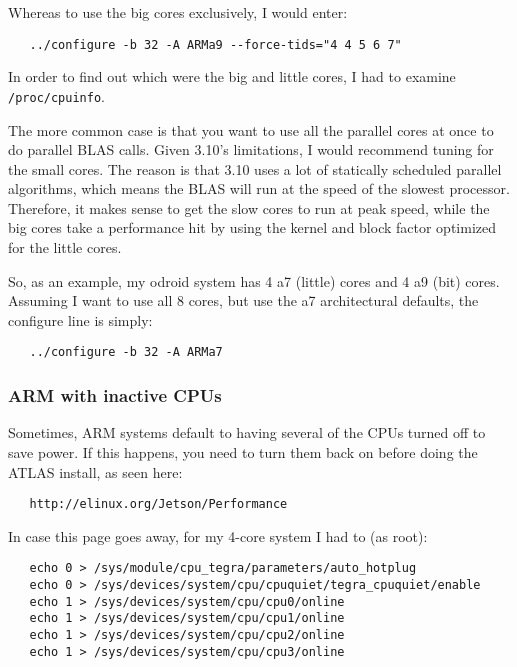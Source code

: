 \documentclass[11pt]{article}
\begin{document}
Whereas to use the big cores exclusively, I would enter:
\begin{verbatim}
   ../configure -b 32 -A ARMa9 --force-tids="4 4 5 6 7"
\end{verbatim}

In order to find out which were the big and little cores, I had to examine
\verb+/proc/cpuinfo+.

The more common case is that you want to use all the parallel cores at once
to do parallel BLAS calls.
Given 3.10's limitations, I would recommend tuning for the small cores.  
The reason is that 3.10 uses a lot of statically scheduled parallel algorithms,
which means the BLAS will run at the speed of the slowest processor.
Therefore, it makes sense to get the slow cores to run at peak speed,
while the big cores take a performance hit by using the kernel and block
factor optimized for the little cores.  

So, as an example, my odroid system has 4 a7 (little) cores and 4 a9
(bit) cores.  Assuming I want to use all 8 cores, but use the a7 architectural
defaults, the configure line is simply:
\begin{verbatim}
   ../configure -b 32 -A ARMa7
\end{verbatim}


\subsubsection{ARM with inactive CPUs}
Sometimes, ARM systems default to having several of the CPUs turned off to save
power.  If this happens, you need to turn them back on before doing the ATLAS
install, as seen here:
\begin{verbatim}
   http://elinux.org/Jetson/Performance
\end{verbatim}
In case this page goes away, for my 4-core system I had to (as root):
\begin{verbatim}
   echo 0 > /sys/module/cpu_tegra/parameters/auto_hotplug
   echo 0 > /sys/devices/system/cpu/cpuquiet/tegra_cpuquiet/enable
   echo 1 > /sys/devices/system/cpu/cpu0/online
   echo 1 > /sys/devices/system/cpu/cpu1/online
   echo 1 > /sys/devices/system/cpu/cpu2/online
   echo 1 > /sys/devices/system/cpu/cpu3/online
\end{verbatim}
\end{document}
